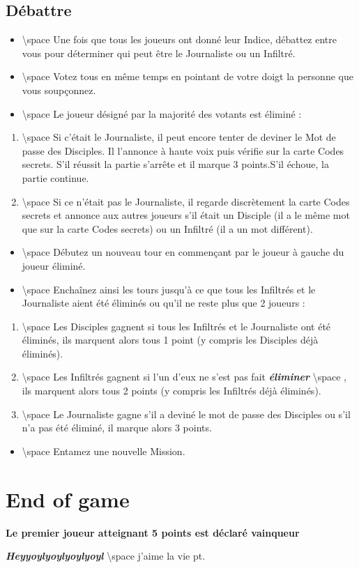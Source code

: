 \documentclass{article}%
\begin{document}
\subsection{ Débattre
}%
\label{subsec:Dbattre}%
\begin{itemize}%
\item%
%
\textbackslash{}space%
 Une fois que tous les joueurs ont donné leur Indice, débattez entre vous pour déterminer qui peut être le Journaliste ou un Infiltré.
%
\item%
%
\textbackslash{}space%
 Votez tous en même temps en pointant de votre doigt la personne que vous soupçonnez.
%
\item%
%
\textbackslash{}space%
 Le joueur désigné par la majorité des votants est éliminé :
%
\end{itemize}%
\begin{enumerate}%
\item%
%
\textbackslash{}space%
 Si c’était le Journaliste, il peut encore tenter de deviner le Mot de passe des Disciples. Il l'annonce à haute voix puis vérifie sur la carte Codes secrets. S’il réussit la partie s’arrête et il marque 3 points.S’il échoue, la partie continue.
%
\item%
%
\textbackslash{}space%
 Si ce n’était pas le Journaliste, il regarde discrètement la carte Codes secrets et annonce aux autres joueurs s’il était un Disciple (il a le même mot que sur la carte Codes secrets) ou un Infiltré (il a un mot différent).
%
\end{enumerate}%
\begin{itemize}%
\item%
%
\textbackslash{}space%
 Débutez un nouveau tour en commençant par le joueur à gauche du joueur éliminé.
%
\item%
%
\textbackslash{}space%
 Enchaînez ainsi les tours jusqu’à ce que tous les Infiltrés et le Journaliste aient été éliminés ou qu’il ne reste plus que 2 joueurs :
%
\end{itemize}%
\begin{enumerate}%
\item%
%
\textbackslash{}space%
 Les Disciples gagnent si tous les Infiltrés et le Journaliste ont été éliminés, ils marquent alors tous 1 point (y compris les Disciples déjà éliminés).
%
\item%
%
\textbackslash{}space%
 Les Infiltrés gagnent si l'un d'eux ne s'est pas fait %
\textbf{\textit{éliminer}}%
\textbackslash{}space%
 , ils marquent alors tous 2 points (y compris les Infiltrés déjà éliminés).
%
\item%
%
\textbackslash{}space%
 Le Journaliste gagne s'il a deviné le mot de passe des Disciples ou s'il n'a pas été éliminé, il marque alors 3 points.
%
\end{enumerate}%
\begin{itemize}%
\item%
%
\textbackslash{}space%
 Entamez une nouvelle Mission.
%
\end{itemize}

%
\section{ End of game
}%
\label{sec:Endofgame}%
\textbf{Le premier joueur atteignant 5 points est déclaré vainqueur}%

%
\textbf{\textit{Heyyoylyoylyoylyoyl}}%
\textbackslash{}space%
 j'aime la vie pt.

%
\end{document}
